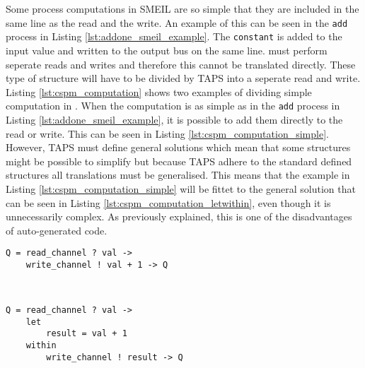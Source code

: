 Some process computations in SMEIL are so simple that they are included in the same line as the read and the write. An example of this can be seen in the \texttt{add} process in Listing \ref{lst:addone_smeil_example}. The \texttt{constant} is added to the input value and written to the output bus on the same line. \cspm{} must perform seperate reads and writes and therefore this cannot be translated directly. These type of structure will have to be divided by TAPS into a seperate read and write. Listing \ref{lst:cspm_computation} shows two examples of dividing simple computation in \cspm{}. When the computation is as simple as in the \texttt{add} process in Listing \ref{lst:addone_smeil_example}, it is possible to add them directly to the read or write. This can be seen in Listing \ref{lst:cspm_computation_simple}.
However, TAPS must define general solutions which mean that some structures might be possible to simplify but because TAPS adhere to the standard defined structures all translations must be generalised. This means that the example in Listing \ref{lst:cspm_computation_simple} will be fittet to the general solution that can be seen in Listing \ref{lst:cspm_computation_letwithin}, even though it is unnecessarily complex. As previously explained, this is one of the disadvantages of auto-generated code.
\begin{minipage}[t]{.98\linewidth}
    \centering
\begin{minipage}[t]{0.45\linewidth}
\begin{verbatim}
Q = read_channel ? val ->
    write_channel ! val + 1 -> Q



\end{verbatim}
  \label{lst:cspm_computation_simple}
\end{minipage}
\hspace{0.6cm}
\begin{minipage}[t]{0.45\linewidth}
\begin{verbatim}
Q = read_channel ? val ->
    let
        result = val + 1
    within
        write_channel ! result -> Q
\end{verbatim}
\label{lst:cspm_computation_letwithin}
\end{minipage}
\vspace{0.3cm}
\label{lst:cspm_computation}
\vspace{1cm}
\end{minipage}

